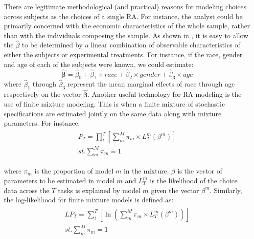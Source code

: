\documentclass[../main.tex]{subfiles}
\begin{document}
\addtocounter{footnote}{-1}

There are legitimate methodological (and practical) reasons for modeling choices across subjects as the choices of a single RA.
For instance, the analyst could be primarily concerned with the economic characteristics of the whole sample, rather than with the individuals composing the sample.
As shown in \textcite[142]{Harrison2008a}, it is easy to allow the $\hat{\beta}$ to be determined by a linear combination of observable characteristics of either the subjects or experimental treatments.
For instance, if the race, gender and age of each of the subjects were known, we could estimate:
\begin{equation}
	\label{eq:BB}
	\bm{\hat{\beta}} = \hat{\beta}_0 + \hat{\beta}_1 \times \mathit{race} + \hat{\beta}_2 \times \mathit{gender} + \hat{\beta}_3 \times \mathit{age}
\end{equation}
\noindent where $\hat{\beta}_1$ through $\hat{\beta}_3$ represent the mean marginal effects of race through age respectively on the vector $\bm{\hat{\beta}}$.
Another useful technology for RA modeling is the use of finite mixture modeling.
This is when a finite mixture of stochastic specifications are estimated jointly on the same data along with mixture parameters.
For instance,
\begin{align}
	\label{eq:PT_Mix}
	\begin{split}
		\bm{\mathit{P_T}} = \prod_t^T \left[ \sum_m^M \pi_m \times L_T^m(\beta^m) \right]\\ 
		\mathit{st.} \sum_m^M \pi_m = 1
	\end{split}
\end{align}

\noindent where $\pi_m$ is the proportion of model $m$ in the mixture, $\beta$ is the vector of parameters to be estimated in model $m$ and $L_T^m$ is the likelihood of the choice data across the $T$ tasks is explained by model $m$ given the vector $\beta^m$.
Similarly, the log-likelihood for finite mixture models is defined as:
\begin{align}
	\label{eq:LPT_Mix}
	\begin{split}
		\bm{\mathit{LP_T}} = \sum_t^T \left[ \ln \left( \sum_m^M \pi_m \times L_T^m(\beta^m) \right) \right]\\ 
		\mathit{st.} \sum_m^M \pi_m = 1
	\end{split}
\end{align}
\end{document}
